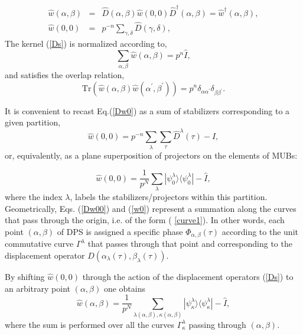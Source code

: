 \documentclass{article}
\begin{document}
\begin{eqnarray}
\hat{w}\left( \alpha ,\beta \right) &=&\hat{D}\left( \alpha ,\beta \right) 
\hat{w}\left( 0,0\right) \hat{D}^{\dagger }\left( \alpha ,\beta \right) =%
\hat{w}^{\dagger }(\alpha ,\beta ),  \label{Ds} \\
\hat{w}\left( 0,0\right) &=&p^{-n}\sum_{\gamma ,\delta }\hat{D}(\gamma
,\delta ),  \label{Dw0}
\end{eqnarray}%
The kernel (\ref{Ds}) is normalized according to, 
\begin{equation}
\sum_{\alpha ,\beta }\hat{w}\left( \alpha ,\beta \right) =p^{n}\hat{I},
\end{equation}%
and satisfies the overlap relation, 
\begin{equation}
\mathrm{Tr}\left( \hat{w}(\alpha ,\beta )\hat{w}(\alpha ^{\prime },\beta
^{\prime })\right) =p^{n}\delta _{\alpha \alpha ^{\prime }}\delta _{\beta
\beta ^{\prime }}.
\end{equation}

It is convenient to recast Eq.(\ref{Dw0}) as a sum of stabilizers
corresponding to a given partition, 
\begin{equation}
\hat{w}\left( 0,0\right) =p^{-n}\sum_{\lambda }\sum_{\tau }\hat{D}^{\lambda
}(\tau )-\hat{I},  \label{Dw00}
\end{equation}%
or, equivalently, as a plane superposition of projectors on the elements of
MUBs:

\begin{equation}
\hat{w}\left( 0,0\right) =\frac{1}{p^{N}}\sum_{\lambda }|\psi _{0}^{\lambda
}\rangle \langle \psi _{0}^{\lambda }|-\hat{I},  \label{w0}
\end{equation}%
where the index $\lambda $, labels the stabilizers/projectors within this
partition. Geometrically, Eqs. (\ref{Dw00}) and (\ref{w0}) represent a
summation along the curves that pass through the origin, i.e. of the form (%
\ref{curve1}). In other words, each point $(\alpha ,\beta )$ of DPS is
assigned a specific phase $\Phi _{\alpha ,\beta }\left( \tau \right) $
according to the unit commutative curve $\Gamma ^{\lambda }$ that passes
through that point and corresponding to the displacement operator $D\left(
\alpha _{\lambda }(\tau ),\beta _{\lambda }(\tau )\right) $.

By shifting $\hat{w}\left( 0,0\right) $ through the action of the
displacement operators (\ref{Ds}) to an arbitrary point $(\alpha ,\beta )$
one obtains 
\begin{equation}
\hat{w}(\alpha ,\beta )=\frac{1}{p^{N}}\sum_{\lambda (\alpha ,\beta ),\kappa
(\alpha ,\beta )}|\psi _{\kappa }^{\lambda }\rangle \langle \psi _{\kappa
}^{\lambda }|-\hat{I},  \label{wab}
\end{equation}%
where the sum is performed over all the curves $\Gamma _{\kappa }^{\lambda }$
passing through $(\alpha ,\beta )$.
\end{document}
